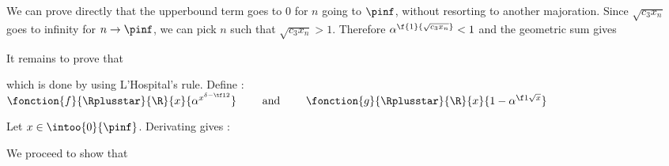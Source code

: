 


\noindent We can prove directly that the upperbound term goes to 0 
for $n$ going to $\pinf$,
without resorting to another majoration.
Since $\sqrt{c_3 x_n}$ goes to infinity for $n \rightarrow \pinf$,
we can pick $n$ such that $\sqrt{c_3 x_n} > 1$. Therefore
$\alpha^{\f{1}{\sqrt{c_3 x_n}}} < 1$ and the geometric sum gives


\noindent It remains to prove that 

which is done by using L'Hospital's rule.
Define :
\centers
    {$ \fonction
            {f}
            { \Rplusstar }
            { \R }
            { x }
            { \alpha^{ x^{ \delta - \tf12 } } }
      \qquad \text{ and } \qquad
      \fonction
        {g}
        { \Rplusstar }
        { \R }
        { x }
        {  1 - \alpha^{ \f1{ \sqrt{x} } } } $}

\noindent Let $x \in \intoo{0}{\pinf}$. Derivating gives :


\noindent We proceed to show that 


